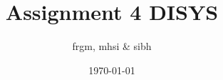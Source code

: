 \usepackage[utf8]{inputenc}
\usepackage{graphicx}
\usepackage{float}
\usepackage{caption}
\usepackage{url}
\usepackage{enumitem}
\usepackage{wrapfig} %
\usepackage{fancyvrb}
\usepackage[nottoc,numbib]{tocbibind} %
\usepackage{listings}
\usepackage{xcolor}

\usepackage{hyperref}
\hypersetup{
    colorlinks=true,
    linkcolor=blue,
    filecolor=magenta,      
    urlcolor=cyan,
}

\graphicspath{{./images/}}

\title{Assignment 4 DISYS}
\author{frgm, mhsi & sibh}
\date{\today}